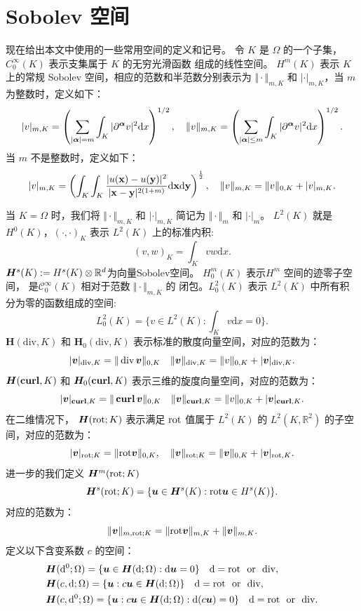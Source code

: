 \section{Sobolev 空间}
现在给出本文中使用的一些常用空间的定义和记号。
令 $K$ 是 $\Omega$ 的一个子集，$C_0^{\infty}(K)$ 表示支集属于 $K$ 的无穷光滑函数
组成的线性空间。
$H^m(K)$ 表示 $K$ 上的常规 Sobolev 空间，相应的范数和半范数分别表示为
$\Vert\cdot\Vert_{m,K}$ 和 $|\cdot|_{m,K}$，当 $m$ 为整数时，定义如下：
$$
|v|_{m,K} = \left(\sum_{|\boldsymbol{\alpha}|=m}\int_K
|\partial^{\boldsymbol{\alpha}}v|^2\mathrm{d}x\right)^{1/2}, \quad
\Vert v\Vert_{m,K} = \left(\sum_{|\boldsymbol{\alpha}|\leq m}\int_K
|\partial^{\boldsymbol{\alpha}}v|^2\mathrm{d}x\right)^{1/2}.
$$
当 $m$ 不是整数时，定义如下：
\begin{equation}
\label{fracSobolev}
|v|_{m,K} = \left(\int_K \int_K \frac{ |u(\mathbf{x}) - u(\mathbf{y})|^2 }{ |\mathbf{x} -
\mathbf{y}|^{2(1+m)} } \mathrm{ d} \mathbf{x} \mathrm{ d} \mathbf{y}\right)^{\frac{1}{2}}, \quad 
\| v \|_{m,K} = \| v \|_{0,K} + |v|_{m,K}.
\end{equation}

当 $K = \Omega$ 时，我们将 $\Vert\cdot\Vert_{m,K}$ 和 $|\cdot|_{m,K}$
简记为 $\Vert\cdot\Vert_{m}$ 和 $|\cdot|_{m}$。 $L^2(K)$ 就是
$H^0(K)$，$(\cdot, \cdot)_K$ 表示 $L^2(K)$ 上的标准内积:
$$
(v, w)_K = \int_K vw\mathrm{d}x.
$$
$\boldsymbol{H}^s(K): = H^s(K)\otimes \mathbb{R}^d$为向量Sobolev空间。
$H_0^m(K)$ 表示$H^m$ 空间的迹零子空间，
是$\mathcal C_0^{\infty}(K)$ 相对于范数 $\Vert\cdot\Vert_{m,K}$ 的
闭包。$L_0^2(K)$ 表示 $L^2(K)$ 中所有积分为零的函数组成的空间:
$$
L_0^2(K) = \{v\in L^2(K): \int_K v\mathrm{d}x = 0\}.
$$
$\boldsymbol{H}(\mathrm{div}, K)$ 和 $\boldsymbol{H}_0(\mathrm{div},
K)$ 表示标准的散度向量空间，对应的范数为：
$$
|\boldsymbol{v}|_{\mathrm{div}, K} = \|\operatorname{div} \boldsymbol{v}\|_{0, K}\quad
\Vert\boldsymbol{v}\Vert_{\mathrm{div}, K} = \|v\|_{0,K} +
|\boldsymbol{v}|_{\mathrm{div}, K}.
$$
$\boldsymbol{H}(\operatorname{\textbf{curl}}, K)$ 和 $\boldsymbol{H}_0(\operatorname{\textbf{curl}},
K)$ 表示三维的旋度向量空间，对应的范数为：
$$
|\boldsymbol{v}|_{\operatorname{\textbf{curl}}, K} = \|\operatorname{\textbf{curl}} \boldsymbol{v}\|_{0, K}\quad
\Vert\boldsymbol{v}\Vert_{\operatorname{\textbf{curl}}, K} = \|v\|_{0,K} +
|\boldsymbol{v}|_{\operatorname{\textbf{curl}}, K}.
$$
在二维情况下，
$\boldsymbol{H}(\mathrm{rot};K)$ 表示满足 $\mathrm{rot}$ 值属于 $L^2(K)$ 的 $L^2(K, \mathbb{R}^2)$
的子空间，对应的范数为：
$$
|\boldsymbol{v}|_{\mathrm{rot};K} = \|\mathrm{rot} \boldsymbol{v}\|_{0,K}, \quad \|\boldsymbol{v}\|_{\mathrm{rot};K} =
\|\boldsymbol{v}\|_{0,K} + |\boldsymbol{v}|_{\mathrm{rot},K}.
$$
进一步的我们定义 $\boldsymbol{H}^m(\mathrm{rot};K)$
$$
\boldsymbol{H}^s(\mathrm{rot};K) = \{ \boldsymbol{u} \in \boldsymbol{H}^s(K): \mathrm{rot} \boldsymbol{u} \in H^s(K) \}.
$$
对应的范数为：
$$
\|\boldsymbol{v}\|_{m,\mathrm{rot};K} = \| \mathrm{rot} \boldsymbol{v} \|_{m,K} + \| \boldsymbol{v} \|_{m,K}.
$$
定义以下含变系数 $c$ 的空间：
\begin{subequations}
\label{spaces}
\begin{align}
& \boldsymbol{H}(\mathrm{ d}^0;\Omega) = \{ \boldsymbol{u} \in \boldsymbol{H}(\mathrm{ d};\Omega) : \mathrm{ d} \boldsymbol{u} = 0 \} ~~~ \mathrm{ d} = \mathrm{rot} ~ \text{ or } ~ \mathrm{div},  \label{spaces1} \\
& \boldsymbol{H}(c, \mathrm{ d}  ;\Omega) = \{ \boldsymbol{u}: c \boldsymbol{u} \in \boldsymbol{H}(\mathrm{ d};\Omega)  \} ~~~ \mathrm{ d} = \mathrm{rot} ~ \text{ or } ~ \mathrm{div} \label{spaces2} , \\
& \boldsymbol{H}(c, \mathrm{ d}^0  ;\Omega) = \{ \boldsymbol{u}: c \boldsymbol{u} \in \boldsymbol{H}(\mathrm{ d};\Omega) : \mathrm{ d} (c\boldsymbol{u}) = 0
\} ~~~ \mathrm{ d} = \mathrm{rot} ~ \text{ or } ~ \mathrm{div} \label{spaces3}.
\end{align}
\end{subequations}

